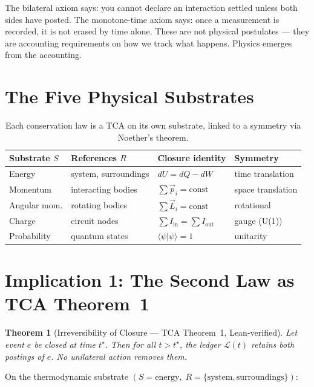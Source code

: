 \documentclass[11pt]{article}
\newtheorem{theorem}{Theorem}
\theoremstyle{definition}
\theoremstyle{remark}
\begin{document}
The bilateral axiom says: you cannot declare an interaction settled
unless both sides have posted. The monotone-time axiom says: once
a measurement is recorded, it is not erased by time alone. These
are not physical postulates --- they are accounting requirements on
how we track what happens. Physics emerges from the accounting.

\section{The Five Physical Substrates}

\begin{table}[h]
\centering
\begin{tabular}{@{}llll@{}}
\toprule
\textbf{Substrate $S$} & \textbf{References $R$} & \textbf{Closure identity} & \textbf{Symmetry} \\
\midrule
Energy     & system, surroundings & $dU = dQ - dW$ & time translation \\
Momentum   & interacting bodies & $\sum \vec{p}_i = \text{const}$ & space translation \\
Angular mom.& rotating bodies & $\sum \vec{L}_i = \text{const}$ & rotational \\
Charge     & circuit nodes & $\sum I_{\text{in}} = \sum I_{\text{out}}$ & gauge (U(1)) \\
Probability & quantum states & $\langle \psi | \psi \rangle = 1$ & unitarity \\
\bottomrule
\end{tabular}
\caption{Each conservation law is a TCA on its own substrate, linked
to a symmetry via Noether's theorem.}
\end{table}

\section{Implication 1: The Second Law as TCA Theorem~1}

\begin{theorem}[Irreversibility of Closure --- TCA Theorem~1, Lean-verified]
Let event $e$ be closed at time $t^\star$. Then for all $t > t^\star$,
the ledger $\mathcal{L}(t)$ retains both postings of $e$. No
unilateral action removes them.
\end{theorem}

On the thermodynamic substrate $(S = \text{energy},\;
R = \{\text{system},\text{surroundings}\})$:
\end{document}
